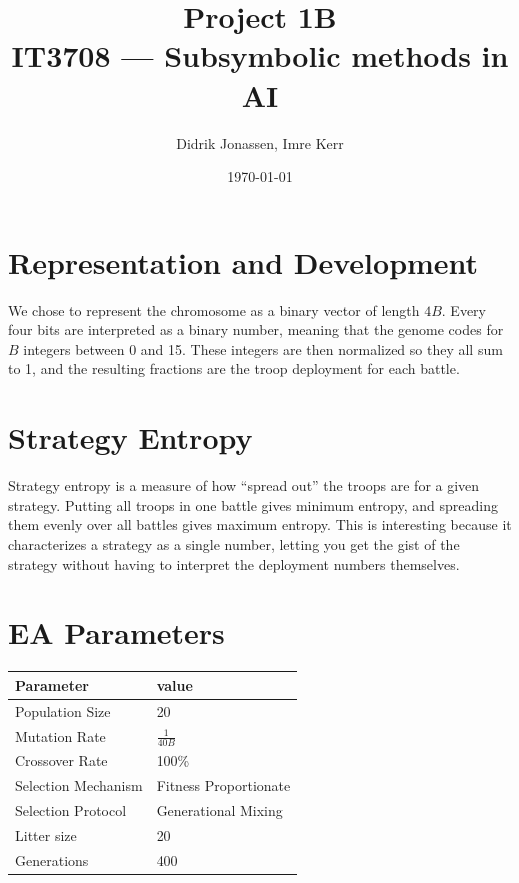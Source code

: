 \documentclass[a4paper,12pt]{article}
\author{Didrik Jonassen, Imre Kerr}
\title{Project 1B\\ IT3708 --- Subsymbolic methods in AI}
\date{\today}
\begin{document}
\maketitle

\section{Representation and Development}
We chose to represent the chromosome as a binary vector of length $4B$. Every four bits are interpreted as a binary number, meaning that the genome codes for $B$ integers between 0 and 15. These integers are then normalized so they all sum to 1, and the resulting fractions are the troop deployment for each battle.

\section{Strategy Entropy}
Strategy entropy is a measure of how ``spread out'' the troops are for a given strategy. Putting all troops in one battle gives minimum entropy, and spreading them evenly over all battles gives maximum entropy. This is interesting because it characterizes a strategy as a single number, letting you get the gist of the strategy without having to interpret the deployment numbers themselves.

\section{EA Parameters}
\begin{tabular}{|l|l|}
\hline
Parameter & value \\
\hline \hline
Population Size & 20 \\
Mutation Rate & $\frac{1}{40B}$ \\
Crossover Rate & 100\% \\
Selection Mechanism & Fitness Proportionate \\
Selection Protocol & Generational Mixing \\
Litter size & 20 \\
Generations & 400 \\
\hline
\end{tabular}
\end{document}
